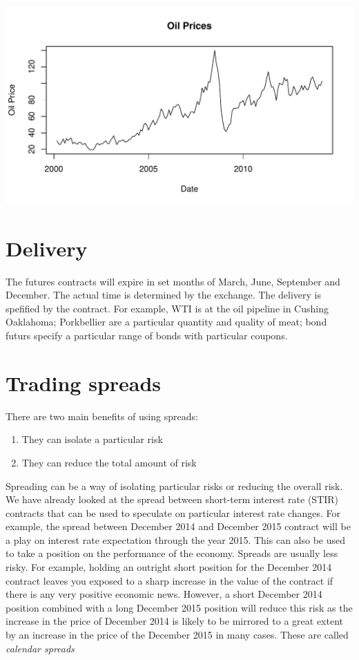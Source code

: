 \documentclass[12pt, a4paper, oneside]{article}\usepackage[]{graphicx}\usepackage[]{color}
\makeatletter
\def\maxwidth{ %
  \ifdim\Gin@nat@width>\linewidth
    \linewidth
  \else
    \Gin@nat@width
  \fi
}
\newenvironment{knitrout}{}{} %
\makeatother
\begin{document}
\begin{knitrout}
\color{fgcolor}
\includegraphics[width=\maxwidth]{figure/oilprice-1} 

\end{knitrout}

\section*{Delivery}
The futures contracts will expire in set months of March, June, September and December.  The actual time is determined by the exchange. The delivery is spefified by the contract.  For example, WTI is at the oil pipeline in Cushing Oaklahoma; Porkbellier are a particular quantity and quality of meat; bond futurs specify a particular range of bonds with particular coupons. 

\section*{Trading spreads}
There are two main benefits of using spreads:  

\begin{enumerate}
\item They can isolate a particular risk
\item They can reduce the total amount of risk
\end{enumerate}

Spreading can be a way of isolating particular risks or reducing the overall risk.  We have already looked at the spread between short-term interest rate (STIR) contracts that can be used to speculate on particular interest rate changes.  For example, the spread between December 2014 and December 2015 contract will be a play on interest rate expectation through the year 2015.  This can also be used to take a position on the performance of the economy.  Spreads are usually less risky.  For example, holding an outright short position for the December 2014 contract leaves you exposed to a sharp increase in the  value of the contract if there is any very positive economic news.  However, a short December 2014 position combined with  a long December 2015 position will reduce this risk as the increase in the price of December 2014 is likely to be mirrored to a great extent by an increase in the price of the December 2015 in many cases.  These are called \emph{calendar spreads}
\end{document}
